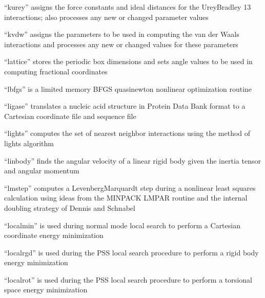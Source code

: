 \documentclass[letterpaper,11pt,english]{sphinxmanual}
\begin{document}
“kurey” assigns the force constants and ideal distances
for the Urey\sphinxhyphen{}Bradley 1\sphinxhyphen{}3 interactions; also processes any
new or changed parameter values


“kvdw” assigns the parameters to be used in computing the
van der Waals interactions and processes any new or changed
values for these parameters


“lattice” stores the periodic box dimensions and sets angle
values to be used in computing fractional coordinates


“lbfgs” is a limited memory BFGS quasi\sphinxhyphen{}newton nonlinear
optimization routine


“ligase” translates a nucleic acid structure in Protein Data
Bank format to a Cartesian coordinate file and sequence file


“lights” computes the set of nearest neighbor interactions
using the method of lights algorithm


“linbody” finds the angular velocity of a linear rigid body
given the inertia tensor and angular momentum


“lmstep” computes a Levenberg\sphinxhyphen{}Marquardt step during a nonlinear
least squares calculation using ideas from the MINPACK LMPAR
routine and the internal doubling strategy of Dennis and Schnabel


“localmin” is used during normal mode local search to
perform a Cartesian coordinate energy minimization


“localrgd” is used during the PSS local search procedure
to perform a rigid body energy minimization


“localrot” is used during the PSS local search procedure
to perform a torsional space energy minimization
\end{document}
